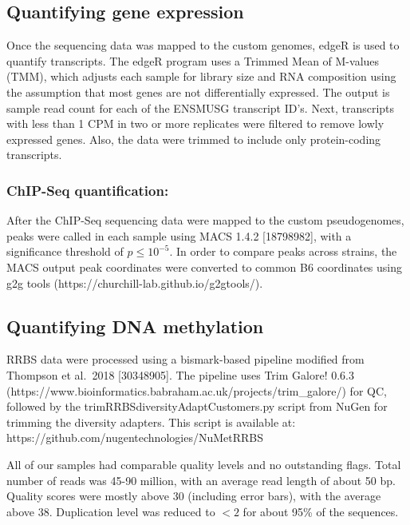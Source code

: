 \documentclass[10pt,letterpaper]{article}
\begin{document}
\hypertarget{quantifying-gene-expression}{%
\subsection{Quantifying gene
expression}\label{quantifying-gene-expression}}

Once the sequencing data was mapped to the custom genomes, edgeR is used
to quantify transcripts. The edgeR program uses a Trimmed Mean of
M-values (TMM), which adjusts each sample for library size and RNA
composition using the assumption that most genes are not differentially
expressed. The output is sample read count for each of the ENSMUSG
transcript ID's. Next, transcripts with less than 1 CPM in two or more
replicates were filtered to remove lowly expressed genes. Also, the data
were trimmed to include only protein-coding transcripts.

\hypertarget{chip-seq-quantification}{%
\subsubsection{ChIP-Seq quantification:}\label{chip-seq-quantification}}

After the ChIP-Seq sequencing data were mapped to the custom
pseudogenomes, peaks were called in each sample using MACS 1.4.2
{[}18798982{]}, with a significance threshold of \(p \leq 10^{-5}\). In
order to compare peaks across strains, the MACS output peak coordinates
were converted to common B6 coordinates using g2g tools
(https://churchill-lab.github.io/g2gtools/).

\hypertarget{quantifying-dna-methylation}{%
\subsection{Quantifying DNA
methylation}\label{quantifying-dna-methylation}}

RRBS data were processed using a bismark-based pipeline modified from
Thompson et al.~2018 {[}30348905{]}. The pipeline uses Trim Galore!
0.6.3 (https://www.bioinformatics.babraham.ac.uk/projects/trim\_galore/)
for QC, followed by the trimRRBSdiversityAdaptCustomers.py script from
NuGen for trimming the diversity adapters. This script is available at:
https://github.com/nugentechnologies/NuMetRRBS

All of our samples had comparable quality levels and no outstanding
flags. Total number of reads was 45-90 million, with an average read
length of about 50 bp. Quality scores were mostly above 30 (including
error bars), with the average above 38. Duplication level was reduced to
\(<2\) for about 95\% of the sequences.
\end{document}
